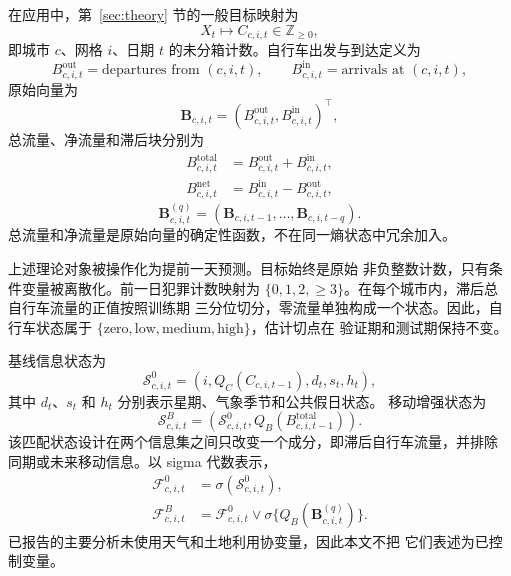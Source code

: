 在应用中，第~\ref{sec:theory} 节的一般目标映射为
\begin{equation}
X_t\longmapsto C_{c,i,t}\in\mathbb Z_{\geq0},
\label{eq:crime_count_definition}
\end{equation}
即城市 \(c\)、网格 \(i\)、日期 \(t\) 的未分箱计数。自行车出发与到达定义为
\begin{equation}
B^{\mathrm{out}}_{c,i,t}
=\text{departures from }(c,i,t),
\qquad
B^{\mathrm{in}}_{c,i,t}
=\text{arrivals at }(c,i,t),
\label{eq:bicycle_in_out}
\end{equation}
原始向量为
\begin{equation}
\mathbf B_{c,i,t}
=
(B^{\mathrm{out}}_{c,i,t},B^{\mathrm{in}}_{c,i,t})^\top,
\label{eq:bicycle_primitive_vector}
\end{equation}
总流量、净流量和滞后块分别为
\begin{align}
B^{\mathrm{total}}_{c,i,t}
&=B^{\mathrm{out}}_{c,i,t}+B^{\mathrm{in}}_{c,i,t},
\label{eq:bicycle_total_flow}\\
B^{\mathrm{net}}_{c,i,t}
&=B^{\mathrm{in}}_{c,i,t}-B^{\mathrm{out}}_{c,i,t},
\label{eq:bicycle_net_flow}
\end{align}
\begin{equation}
\mathbf B^{(q)}_{c,i,t}
=
(\mathbf B_{c,i,t-1},\ldots,\mathbf B_{c,i,t-q}).
\label{eq:bicycle_lag_block}
\end{equation}
总流量和净流量是原始向量的确定性函数，不在同一熵状态中冗余加入。

上述理论对象被操作化为提前一天预测。目标始终是原始
非负整数计数，只有条件变量被离散化。前一日犯罪计数映射为
\(\{0,1,2,\geq3\}\)。在每个城市内，滞后总自行车流量的正值按照训练期
三分位切分，零流量单独构成一个状态。因此，自行车状态属于
\(\{\text{zero},\text{low},\text{medium},\text{high}\}\)，估计切点在
验证期和测试期保持不变。

基线信息状态为
\begin{equation}
\mathcal{S}^{0}_{c,i,t}
=\left(i,Q_C(C_{c,i,t-1}),d_t,s_t,h_t\right),
\label{eq:empirical_baseline_state}
\end{equation}
其中 \(d_t\)、\(s_t\) 和 \(h_t\) 分别表示星期、气象季节和公共假日状态。
移动增强状态为
\begin{equation}
\mathcal{S}^{B}_{c,i,t}
=\left(\mathcal{S}^{0}_{c,i,t},
Q_B(B^{\mathrm{total}}_{c,i,t-1})\right).
\label{eq:empirical_bicycle_state}
\end{equation}
该匹配状态设计在两个信息集之间只改变一个成分，即滞后自行车流量，并排除
同期或未来移动信息。以 sigma 代数表示，
\begin{align}
\mathcal F^0_{c,i,t}
&=\sigma(\mathcal S^0_{c,i,t}),
\label{eq:baseline_information}\\
\mathcal F^B_{c,i,t}
&=\mathcal F^0_{c,i,t}\vee
\sigma\{Q_B(\mathbf B^{(q)}_{c,i,t})\}.
\label{eq:bike_information}
\end{align}
已报告的主要分析未使用天气和土地利用协变量，因此本文不把
它们表述为已控制变量。

